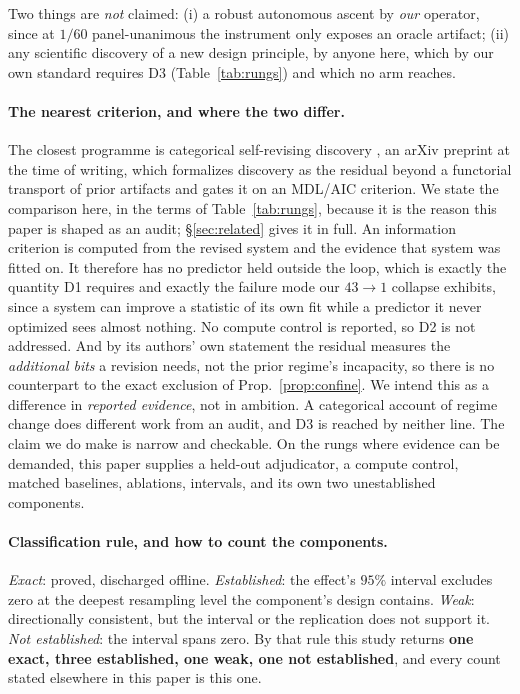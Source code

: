 \documentclass[11pt]{article}
\begin{document}
Two things are \emph{not} claimed: (i) a robust autonomous ascent by \emph{our} operator, since at $1/60$
panel-unanimous the instrument only exposes an oracle artifact; (ii) any scientific discovery of a new design
principle, by anyone here, which by our own standard requires D3 (Table~\ref{tab:rungs}) and which no arm
reaches.

\paragraph{The nearest criterion, and where the two differ.} The closest programme is categorical
self-revising discovery \citep{selfrevising}, an arXiv preprint at the time of writing, which formalizes
discovery as the residual beyond a functorial
transport of prior artifacts and gates it on an MDL/AIC criterion. We state the comparison here, in the terms
of Table~\ref{tab:rungs}, because it is the reason this paper is shaped as an audit; \S\ref{sec:related}
gives it in full. An information criterion is computed from the revised system and the evidence that system
was fitted on. It therefore has no predictor held outside the loop, which is exactly the quantity D1
requires and exactly the failure mode our $43\!\to\!1$ collapse exhibits, since a system can improve a statistic of
its own fit while a predictor it never optimized sees almost nothing. No compute control is reported, so D2
is not addressed. And by its authors' own statement the residual measures the \emph{additional bits} a
revision needs, not the prior regime's incapacity, so there is no counterpart to the exact exclusion of
Prop.~\ref{prop:confine}. We intend this as a difference in \emph{reported evidence}, not in ambition. A
categorical account of regime change does different work from an audit, and D3 is reached by neither line. The claim we do make is narrow and checkable. On the rungs where evidence can be demanded, this paper
supplies a held-out adjudicator, a compute control, matched baselines, ablations, intervals, and its own two
unestablished components.

\paragraph{Classification rule, and how to count the components.} \emph{Exact}: proved, discharged offline.
\emph{Established}: the effect's $95\%$ interval excludes zero at the deepest resampling level the component's
design contains. \emph{Weak}: directionally consistent, but the interval or the replication does not support
it. \emph{Not established}: the interval spans zero. By that rule this study returns \textbf{one exact, three
established, one weak, one not established}, and every count stated elsewhere in this paper is this one.
\end{document}
